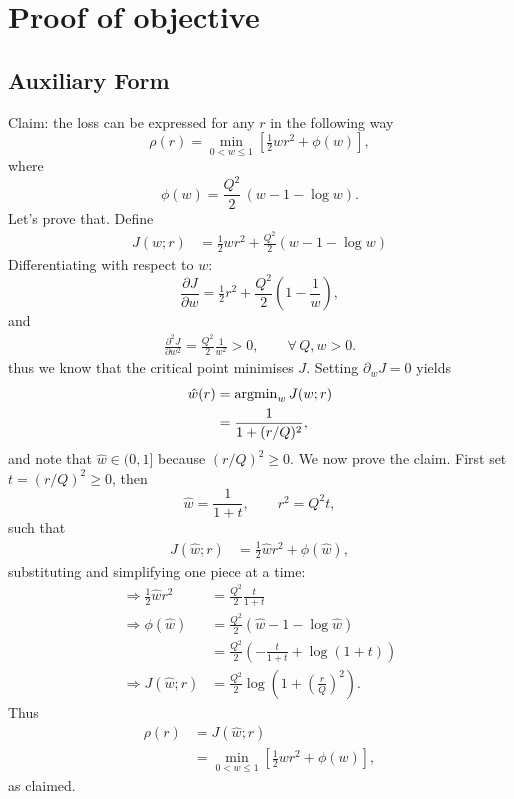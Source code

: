 \documentclass{article}
\begin{document}
\appendix

\section{Proof of objective} \label{sec:proof}

\subsection{Auxiliary Form}

Claim: the loss can be expressed for any $r$ in the following way
\begin{equation}
    \rho(r) = \min_{0<w\leq1} \left[ \tfrac{1}{2} w r^2 + \phi(w) \right],
\end{equation}
where
\begin{equation}
    \phi(w) = \frac{Q^2}{2}\,(w - 1 - \log w).
\end{equation}
Let's prove that. Define
\begin{align}
    J\left( w ; r \right) &= \tfrac{1}{2} w r^2 + \tfrac{Q^2}{2} \left( w - 1 - \log{w}\right)
\end{align}
Differentiating with respect to $w$:
\begin{equation}
    \frac{\partial J}{\partial w} 
    = \tfrac{1}{2}r^2 + \frac{Q^2}{2}\left(1 - \frac{1}{w}\right),
\end{equation}
and
\begin{align}
    \frac{\partial^2 J}{\partial w^2} = \frac{Q^2}{2} \frac{1}{w^2} > 0, \qquad \forall \, Q,w > 0.
\end{align}
thus we know that the critical point minimises $J$.
Setting $\partial_w J=0$ yields
\begin{align}
    \hat{w}(r) &= {\rm argmin}_w \, J (w ; r) \\
    &= \frac{1}{1 + (r/Q)^2},
\end{align}
and note that $\hat{w} \in (0, 1]$ because $(r/Q)^2 \geq 0$.
We now prove the claim. First set $t = (r/Q)^2 \geq 0$, then
\begin{equation}
    \hat{w} = \frac{1}{1+t}, \qquad r^2 = Q^2 t,
\end{equation}
such that
\begin{align}
    J (\hat{w} ; r) &= \tfrac{1}{2} \hat{w} r^2 + \phi(\hat{w}),
\end{align}
substituting and simplifying one piece at a time:
\begin{align}
    \Rightarrow \tfrac{1}{2} \hat{w} r^2 &= \frac{Q^2}{2} \frac{t}{1 + t} \\
    \Rightarrow \phi(\hat{w}) &= \frac{Q^2}{2} \left( \hat{w} - 1 - \log{\hat{w}} \right) \\
    &= \frac{Q^2}{2} \left( -\frac{t}{1 + t} + \log(1 + t) \right) \\
    \Rightarrow J (\hat{w} ; r) &= \frac{Q^2}{2} \log{\left( 1 + \left( \tfrac{r}{Q}\right)^2 \right)}.
\end{align}
Thus
\begin{align}
    \rho(r) &= J ( \hat{w} ; r ) \\
    &= \min_{0<w\leq1} \left[ \tfrac{1}{2} w r^2 + \phi(w) \right],
\end{align}
as claimed.
\end{document}
